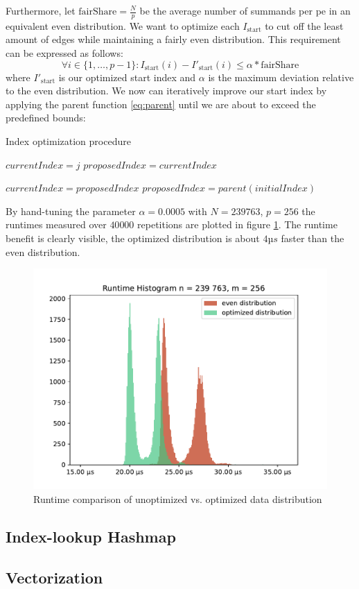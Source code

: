Furthermore, let $\textrm{fairShare} = \tfrac{N}{p}$ be the average number of summands per \gls{pe} in an equivalent even distribution. We want to optimize each $I_\textrm{start}$ to cut off the least amount of edges while maintaining a fairly even distribution. This requirement can be expressed as follows:
\begin{equation}
\label{eq:optimizedIndexBounds}
\forall i \in \{1, \ldots, p - 1\}: I_\textrm{start}(i) - I'_\textrm{start}(i) \leq \alpha * \textrm{fairShare}
\end{equation}
where $I'_\textrm{start}$ is our optimized start index and $\alpha$ is the maximum deviation relative to the even distribution. We now can iteratively
improve our start index by applying the parent function \eqref{eq:parent} until we are about to exceed the predefined bounds:

\begin{algorithm}
\caption{Index optimization procedure}\label{algo:optimizeIndex}
\DontPrintSemicolon
\SetAlgoLined
{}


$currentIndex = j$\;
$proposedIndex = currentIndex$\;

 {
	$currentIndex = proposedIndex$\;
	$proposedIndex = parent(initialIndex)$\;
}
\end{algorithm}

By hand-tuning the parameter $\alpha = 0.0005$ with $N = 239 763$, $p = 256$ the runtimes  measured over $40 000$ repetitions are plotted in figure
\ref{fig:distribution_runtimes}. The runtime benefit is clearly visible, the optimized distribution is about $4µs$ faster than the even distribution.

\begin{figure}
\centering
\includegraphics[scale=0.75]{figures/distribution_experiment}
\caption{Runtime comparison of unoptimized vs. optimized data distribution}
\label{fig:distribution_runtimes}
\end{figure}


\subsection{Index-lookup Hashmap}
\label{sec:IndexLookupHashmap}

\subsection{Vectorization}
\label{sec:Vectorization}